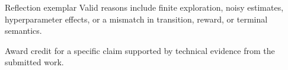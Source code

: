 \documentclass[aspectratio=169,11pt]{beamer}
\begin{document}
\begin{frame}{Reflection exemplar}
\small
\answerlabel Valid reasons include finite exploration, noisy estimates, hyperparameter effects, or a mismatch in transition, reward, or terminal semantics.

\vspace{0.25cm}
\gradinglabel Award credit for a specific claim supported by technical evidence from the submitted work.
\end{frame}
\end{document}
